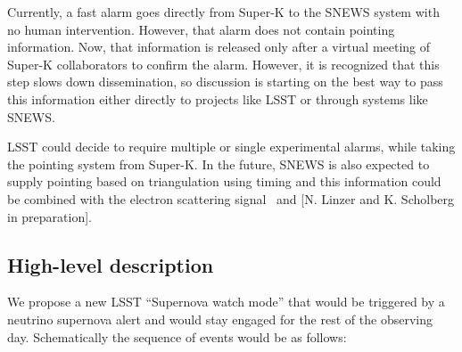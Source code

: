 \documentclass[11pt, letterpaper]{article}
\newcommand{\superk}  {Super\nobreakdash-K\xspace}
\begin{document}
Currently, a fast alarm goes directly from \superk to the SNEWS system
with no human intervention.  However, that alarm does not contain
pointing information.  Now, that information is released only after a
virtual meeting of \superk collaborators to confirm the alarm.
However, it is recognized that this step slows down dissemination, so
discussion is starting on the best way to pass this information either
directly to projects like LSST or through systems like SNEWS.

LSST could decide to require multiple or single experimental alarms,
while taking the pointing system from \superk.  In the future, SNEWS
is also expected to supply pointing based on triangulation using
timing and this information could be combined with the electron
scattering signal~\cite{2018JCAP...04..025B} and [N. Linzer and
K. Scholberg in preparation].

\subsection{High-level description}

We propose a new LSST ``Supernova watch mode'' that would be triggered by a
neutrino supernova alert and would stay engaged for the rest of the
observing day.  Schematically the sequence of events would be as follows:
\end{document}
